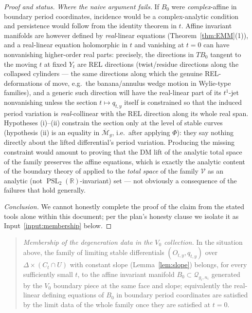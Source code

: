 \documentclass[11pt]{article}
\newcommand{\R}{\mathbb{R}}
\newcommand{\cQ}{\mathcal{Q}}
\newcommand{\M}{\mathcal{M}}
\DeclareMathOperator{\PSL}{PSL}
\theoremstyle{definition}
\theoremstyle{remark}
\begin{document}
\begin{proof}[Proof and status]
\emph{Where the naive argument fails.} If $B_0$ were
\emph{complex}-affine in boundary period coordinates, incidence would be
a complex-analytic condition and persistence would follow from the
identity theorem in $t$. Affine invariant manifolds are however defined
by \emph{real}-linear equations (Theorem~\ref{thm:EMM}(1)), and a
real-linear equation holomorphic in $t$ and vanishing at $t = 0$ can
have nonvanishing higher-order real parts: precisely, the directions in
$T B_0$ tangent to the moving $t$ at fixed $Y_t$ are REL directions
(twist/residue directions along the collapsed cylinders --- the same
directions along which the genuine REL-deformations of \cite{MW} move,
e.g.\ the banana/annulus wedge motion in Wylie-type families), and a
generic such direction will have the real-linear part of its $t^1$-jet
nonvanishing unless the section $t \mapsto q_{t,y}$ itself is
constrained so that the induced period variation is
\emph{real}-collinear with the REL direction along its whole real span.
Hypotheses (i)--(ii) constrain the section only at the level of stable
curves (hypothesis (ii) is an equality in $\overline{\M}_g$, i.e.\
after applying $\Phi$): they say nothing directly about the lifted
differential's period variation. Producing the missing constraint would
amount to proving that the DM lift of the analytic total space of the
family preserves the affine equations, which is exactly the analytic
content of the boundary theory of \cite{MW} applied to the \emph{total
space} of the family $\mathcal V$ as an analytic (not
$\PSL_2(\R)$-invariant) set --- not obviously a consequence of the
failures that hold generally.

\emph{Conclusion.} We cannot honestly complete the proof of the claim
from the stated tools alone within this document; per the plan's
honesty clause we isolate it as Input~\ref{input:membership} below.
\end{proof}

\begin{quote}
\begin{description}[style=nextline]
\item[Input (Mem).]\label{input:membership} \emph{Membership of the
degeneration data in the $V_0$ collection.} In the situation above, the
family of limiting stable differentials $(O_{t,y},q_{t,y})$ over
$\Delta \times (C_t \cap U)$ with constant slope
(Lemma~\ref{lem:slope}) belongs, for every sufficiently small $t$, to
the affine invariant manifold $B_0 \subset \cQ_{g_i,n_i}$ generated by
the $V_0$ boundary piece at the same face and slope; equivalently the
real-linear defining equations of $B_0$ in boundary period coordinates
are satisfied by the limit data of the whole family once they are
satisfied at $t = 0$.
\end{description}
\end{quote}
\end{document}
